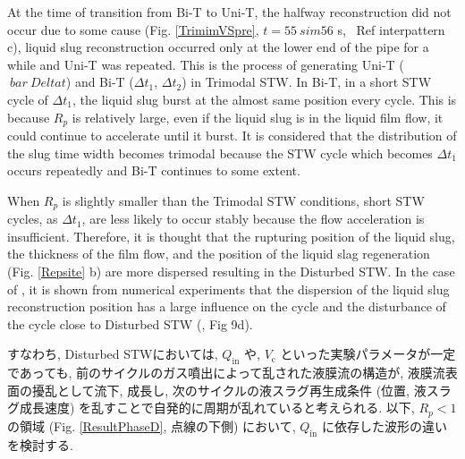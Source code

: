 \documentclass[aps,pre,preprint,groupedaddress,showkeys]{revtex4-2}
\begin{document}
At the time of transition from Bi-T to Uni-T, the halfway reconstruction did not occur due to some cause (Fig. \ref{TrimimVSpre}, $ t = 55 \ sim56 $ s, \ Ref {interpattern} c), liquid slug reconstruction occurred only at the lower end of the pipe for a while and Uni-T was repeated.
This is the process of generating Uni-T ($ \ bar {\ Delta t} $) and Bi-T ($ \Delta t_ {1} $, $ \Delta t_ {2} $) in Trimodal STW.
In Bi-T, in a short STW cycle of $ \Delta t_ {1} $, the liquid slug burst at the almost same position every cycle.
This is because $ R_p $ is relatively large, even if the liquid slug is in the liquid film flow, it could continue to accelerate until it burst.
It is considered that the distribution of the slug time width becomes trimodal because the STW cycle which becomes $ \Delta t_ {1} $ occurs repeatedly and Bi-T continues to some extent.

When $ R_p $ is slightly smaller than the Trimodal STW conditions, short STW cycles, as $ \Delta t_ {1} $, are less likely to occur stably because the flow acceleration is insufficient.
Therefore, it is thought that the rupturing position of the liquid slug, the thickness of the film flow, and the position of the liquid slag regeneration (Fig. \ref{Repsite} b) are more dispersed resulting in the Disturbed STW.
In the case of \cite {kanno 2018}, it is shown from numerical experiments that the dispersion of the liquid slug reconstruction position has a large influence on the cycle and the disturbance of the cycle close to Disturbed STW (\cite{kanno2018}, Fig 9d).

すなわち, Disturbed STWにおいては, $Q_\mathrm{in}$ や, $V_\mathrm{c}$ といった実験パラメータが一定であっても, 前のサイクルのガス噴出によって乱された液膜流の構造が, 液膜流表面の擾乱として流下, 成長し, 次のサイクルの液スラグ再生成条件 (位置, 液スラグ成長速度) を乱すことで自発的に周期が乱れていると考えられる. 
以下, $R_p<1$ の領域 (Fig. \ref{ResultPhaseD}, 点線の下側) において, $Q_\mathrm{in}$ に依存した波形の違いを検討する.
 
\end{document}
